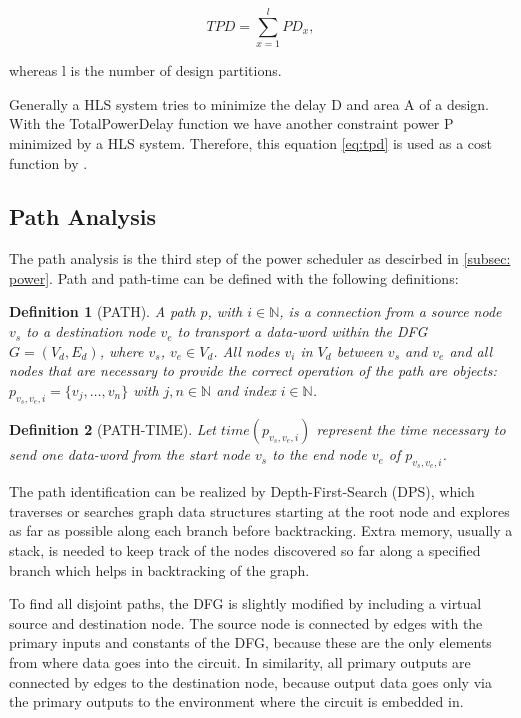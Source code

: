 \documentclass[conference]{IEEEtran}
\newtheorem{definition}{Definition}
\begin{document}
\begin{equation}
TPD = \sum_{x=1}^{l} PD_x,
\label{eq:tpd}
\end{equation}

whereas l is the number of design partitions.

Generally a HLS system tries to minimize the delay D and area A of a design. With the TotalPowerDelay function we have another constraint power P minimized by a HLS system. Therefore, this equation \ref{eq:tpd} is used as a cost function by \cite{Ret}.


\subsection{Path Analysis}
\label{subsec: path analysis}
The path analysis is the third step of the power scheduler as descirbed in \ref{subsec: power}. Path and path-time can be defined with the following definitions:

\begin{definition}[PATH]
\label{def:cfg}
A path $p$, with $i \in \mathbb{N}$, is a connection from a source node $v_s$ to a destination node $v_e$ to transport a data-word within the DFG $G = (V_d, E_d)$, where $v_s$, $v_e \in V_d$. All nodes $v_i$ in $V_d$ between $v_s$ and $v_e$ and all nodes that are necessary to provide the correct operation of the path are objects: $p_{v_s,v_e,i} = \{v_j, \ldots, v_n\}$ with $j, n \in \mathbb{N}$ and index $i \in \mathbb{N}$.
\end{definition}

\begin{definition}[PATH-TIME]
Let $time(p_{v_s,v_e,i})$ represent the time necessary to send one data-word from the start node $v_s$ to the end node $v_e$ of $p_{v_s,v_e,i}$.
\end{definition}

The path identification can be realized by Depth-First-Search (DPS), which traverses or searches graph data structures starting at the root node and explores as far as possible along each branch before backtracking. Extra memory, usually a stack, is needed to keep track of the nodes discovered so far along a specified branch which helps in backtracking of the graph.

To find all disjoint paths, the DFG is slightly modified by including a virtual source and destination node. The source node is connected by edges with the primary inputs and constants of the DFG, because these are the only elements from where data goes into the circuit. In similarity, all primary outputs are connected by edges to the destination node, because output data goes only via the primary outputs to the environment where the circuit is embedded in. 
\end{document}
